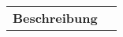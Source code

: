 \renewcommand{\arraystretch}{1.3} %

\begin{tabularx}{\textwidth}{@{}Xr@{}}

\hline
\textbf{Beschreibung} & \textbf{Total <%
\hline

<%
 <%
<%
\end{tabularx}